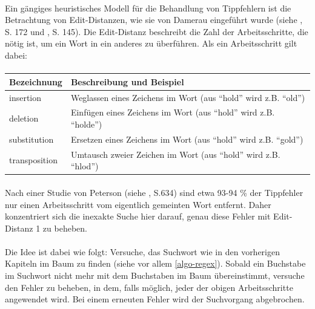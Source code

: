 \paragraph{} Ein gängiges heuristisches Modell für die Behandlung von Tippfehlern ist die Betrachtung von Edit-Distanzen, wie sie von Damerau eingeführt wurde (siehe \cite{damerau}, S. 172 und \cite{jurafsky&martin}, S. 145). Die Edit-Distanz beschreibt die Zahl der Arbeitsschritte, die nötig ist, um ein Wort in ein anderes zu überführen. Als ein Arbeitsschritt gilt dabei:

\paragraph{}

\begin{tabularx}{\textwidth}{lX}
\hline
\textbf{Bezeichnung} & \textbf{Beschreibung und Beispiel} \\ [0.1cm]
\hline
insertion &  Weglassen eines Zeichens im Wort (aus "`hold"' wird z.B. "`old"') \\ [0.1cm]
\hline
deletion &  Einfügen eines Zeichens im Wort (aus "`hold"' wird z.B. "`holde"') \\ [0.1cm]
\hline
substitution & Ersetzen eines Zeichens im Wort (aus "`hold"' wird z.B. "`gold"') \\ [0.1cm]
\hline
transposition & Umtausch zweier Zeichen im Wort (aus "`hold"' wird z.B. "`hlod"') \\ [0.1cm]
\hline
\end{tabularx}

\paragraph{} Nach einer Studie von Peterson (siehe \cite{peterson}, S.634) sind etwa 93-94 \% der Tippfehler nur einen Arbeitsschritt vom eigentlich gemeinten Wort entfernt. Daher konzentriert sich die inexakte Suche hier darauf, genau diese Fehler mit Edit-Distanz 1 zu beheben.
\paragraph{} Die Idee ist dabei wie folgt: Versuche, das Suchwort wie in den vorherigen Kapiteln im Baum zu finden (siehe vor allem \ref{algo-regex}). Sobald ein Buchstabe im Suchwort nicht mehr mit dem Buchstaben im Baum übereinstimmt, versuche den Fehler zu beheben, in dem, falls möglich, jeder der obigen Arbeitsschritte angewendet wird. Bei einem erneuten Fehler wird der Suchvorgang abgebrochen.
